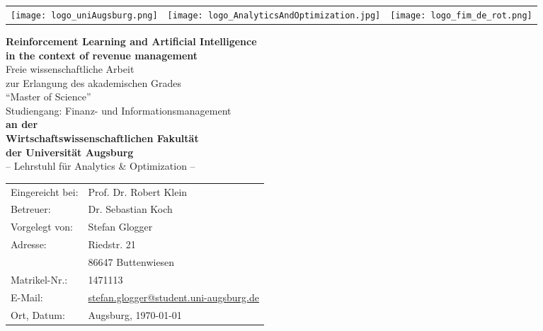 \begin{titlepage}
\begin{spacing}{1.0}
	
\begin{tabularx}{\textwidth}{LYR}
	\texttt{[image: logo\_uniAugsburg.png]} &
	\texttt{[image: logo\_AnalyticsAndOptimization.jpg]} &
	\texttt{[image: logo\_fim\_de\_rot.png]}
\end{tabularx}
\vspace*{1.2cm}
\begin{center}
	{\huge \textbf{Reinforcement Learning and Artificial Intelligence\\
	in the context of revenue management\\}} 
\vspace*{1.2cm}
{\Large Freie wissenschaftliche Arbeit \\
zur Erlangung des akademischen Grades\\
\enquote{Master of Science}\\
Studiengang: Finanz- und Informationsmanagement\\
} 
\vspace*{.8cm}
{\Large \textbf{an der\\
Wirtschaftswissenschaftlichen Fakultät\\
der Universität Augsburg\\
}}
\vspace*{.8cm}
{\Large – Lehrstuhl für Analytics \& Optimization –\\}
\vspace*{.8cm}
{
\begin{tabular}{ll}
Eingereicht bei:& Prof. Dr. Robert Klein\\
Betreuer:& 			Dr. Sebastian Koch\\
Vorgelegt von:&	Stefan Glogger\\
Adresse:&			Riedstr. 21\\
&						86647 Buttenwiesen\\
Matrikel-Nr.:&		1471113\\
E-Mail:&				\href{mailto:stefan.glogger@student.uni-augsburg.de}{stefan.glogger@student.uni-augsburg.de}\\
Ort, Datum:&		Augsburg, \today \\
\end{tabular}
}
\end{center}

\end{spacing}

\end{titlepage}
